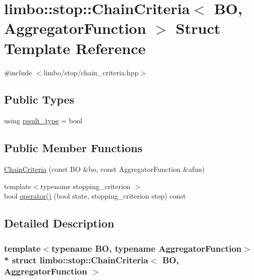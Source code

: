 \hypertarget{structlimbo_1_1stop_1_1_chain_criteria}{}\section{limbo\+:\+:stop\+:\+:Chain\+Criteria$<$ BO, Aggregator\+Function $>$ Struct Template Reference}
\label{structlimbo_1_1stop_1_1_chain_criteria}


{\ttfamily \#include $<$limbo/stop/chain\+\_\+criteria.\+hpp$>$}

\subsection*{Public Types}
\begin{DoxyCompactItemize}
\item 
using \hyperlink{structlimbo_1_1stop_1_1_chain_criteria_a3e9b4e7191e4568a44bba75647bf0fb5}{result\+\_\+type} = bool
\end{DoxyCompactItemize}
\subsection*{Public Member Functions}
\begin{DoxyCompactItemize}
\item 
\hyperlink{structlimbo_1_1stop_1_1_chain_criteria_a287a286866f5ddc83432f23dc1c7c63d}{Chain\+Criteria} (const BO \&bo, const Aggregator\+Function \&afun)
\item 
{\footnotesize template$<$typename stopping\+\_\+criterion $>$ }\\bool \hyperlink{structlimbo_1_1stop_1_1_chain_criteria_a1d95f89ebcc61121482a372d37c3a62f}{operator()} (bool state, stopping\+\_\+criterion stop) const 
\end{DoxyCompactItemize}


\subsection{Detailed Description}
\subsubsection*{template$<$typename BO, typename Aggregator\+Function$>$\\*
struct limbo\+::stop\+::\+Chain\+Criteria$<$ B\+O, Aggregator\+Function $>$}

